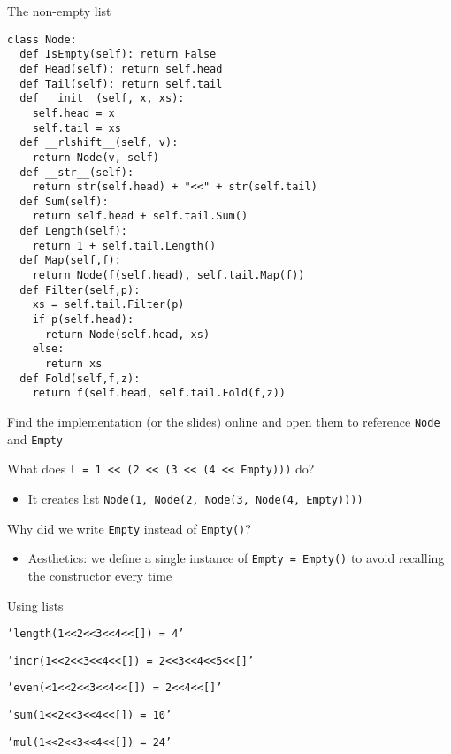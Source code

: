 \documentclass{beamer}
\begin{document}
\begin{frame}[fragile]{The non-empty list}
\begin{lstlisting}
class Node:
  def IsEmpty(self): return False
  def Head(self): return self.head
  def Tail(self): return self.tail
  def __init__(self, x, xs):
    self.head = x
    self.tail = xs
  def __rlshift__(self, v):
    return Node(v, self)
  def __str__(self):
    return str(self.head) + "<<" + str(self.tail)
  def Sum(self):
    return self.head + self.tail.Sum()
  def Length(self):
    return 1 + self.tail.Length()
  def Map(self,f):
    return Node(f(self.head), self.tail.Map(f))
  def Filter(self,p):
    xs = self.tail.Filter(p)
    if p(self.head):
      return Node(self.head, xs)
    else:
      return xs
  def Fold(self,f,z):
    return f(self.head, self.tail.Fold(f,z))
\end{lstlisting}
\end{frame}

\begin{slide}{
\item Find the implementation (or the slides) online and open them to reference \texttt{Node} and \texttt{Empty}
\item What does \texttt{l = 1 << (2 << (3 << (4 << Empty)))} do?
\begin{itemize}
\pause 
\item It creates list \texttt{Node(1, Node(2, Node(3, Node(4, Empty))))}
\end{itemize}
\item Why did we write \texttt{Empty} instead of \texttt{Empty()}?
\begin{itemize}
\pause 
\item Aesthetics: we define a single instance of \texttt{Empty = Empty()} to avoid recalling the constructor every time
\end{itemize}
}\end{slide}

\begin{frame}[fragile]{Using lists}
\begin{codewithblock}{\pause \item \texttt{'length(1<<2<<3<<4<<[]) = 4'} \item \texttt{'incr(1<<2<<3<<4<<[]) = 2<<3<<4<<5<<[]'} \item \texttt{'even(<1<<2<<3<<4<<[]) = 2<<4<<[]'} \item \texttt{'sum(1<<2<<3<<4<<[]) = 10'} \item \texttt{'mul(1<<2<<3<<4<<[]) = 24'}}

\end{codewithblock}
\end{frame}
\end{document}
